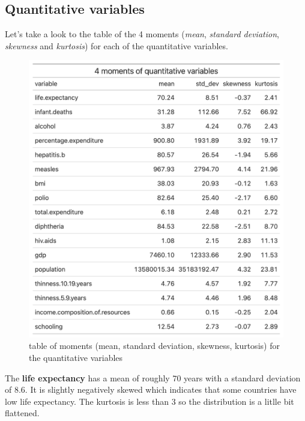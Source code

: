 \subsection{Quantitative variables}

Let's take a look to the table of the 4 moments (\textit{mean}, \textit{standard deviation}, \textit{skewness} and \textit{kurtosis}) for each of the quantitative variables. 

\begin{figure}[H]
	\centering
	\includegraphics{figures/eda/quantitative_variables_moments.png}
	\caption{table of moments (mean, standard deviation, skewness, kurtosis) for the quantitative variables}
	\label{fig:quantitative_variables_moments}
\end{figure}

The \textbf{life expectancy} has a mean of roughly $70$ years with a standard deviation of $8.6$. It is slightly negatively skewed which indicates that some countries have low life expectancy. The kurtosis is less than $3$ so the distribution is a litlle bit flattened.


